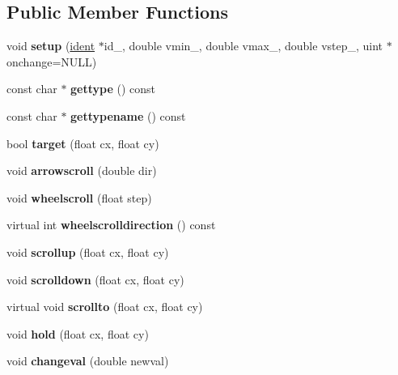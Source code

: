 \subsection*{Public Member Functions}
\begin{DoxyCompactItemize}
\item 
\mbox{\label{struct_u_i_1_1_slider_a26284f17345127fc8cdf11a8a9fe05cc}} 
void {\bfseries setup} (\hyperlink{structident}{ident} $\ast$id\+\_\+, double vmin\+\_, double vmax\+\_, double vstep\+\_, uint $\ast$onchange=N\+U\+LL)
\item 
\mbox{\label{struct_u_i_1_1_slider_a28c6bf84654cd8e33712f7f21d3f7054}} 
const char $\ast$ {\bfseries gettype} () const
\item 
\mbox{\label{struct_u_i_1_1_slider_a2c4aae36e1283c302967baa26f2ee7df}} 
const char $\ast$ {\bfseries gettypename} () const
\item 
\mbox{\label{struct_u_i_1_1_slider_ad253c7b51d822a9a37a210da636a1719}} 
bool {\bfseries target} (float cx, float cy)
\item 
\mbox{\label{struct_u_i_1_1_slider_ab9987fa3e6ae743d6a8d81a805e89f50}} 
void {\bfseries arrowscroll} (double dir)
\item 
\mbox{\label{struct_u_i_1_1_slider_a97fb0fbb48f6dd3f24a990c9a28ed34f}} 
void {\bfseries wheelscroll} (float step)
\item 
\mbox{\label{struct_u_i_1_1_slider_ae068e11302692703178fc60edb960e7a}} 
virtual int {\bfseries wheelscrolldirection} () const
\item 
\mbox{\label{struct_u_i_1_1_slider_a1a0a321ddc918c2e67381e12d2a06d41}} 
void {\bfseries scrollup} (float cx, float cy)
\item 
\mbox{\label{struct_u_i_1_1_slider_aca36544ca1049ad66b8782dc84054790}} 
void {\bfseries scrolldown} (float cx, float cy)
\item 
\mbox{\label{struct_u_i_1_1_slider_af14d0e706449b4a04a0a90ad22a9aa38}} 
virtual void {\bfseries scrollto} (float cx, float cy)
\item 
\mbox{\label{struct_u_i_1_1_slider_a22fc22dd1ac8dfa2966ed881d2dcc73f}} 
void {\bfseries hold} (float cx, float cy)
\item 
\mbox{\label{struct_u_i_1_1_slider_a93c5c209d52e39519e77a482792344a4}} 
void {\bfseries changeval} (double newval)
\end{DoxyCompactItemize}
